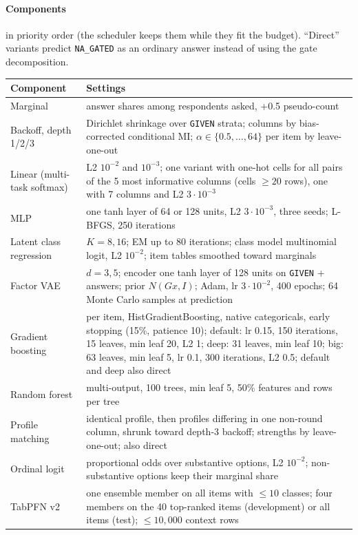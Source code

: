 \documentclass{article}
\begin{document}
\paragraph{Components} in priority order (the scheduler keeps them while they fit the budget).
``Direct'' variants predict \texttt{NA\_GATED} as an ordinary answer instead of using the gate
decomposition.

\begin{table}[h]
  \centering
  \small
  \begin{tabular}{p{3.6cm}p{9.2cm}}
    \toprule
    Component & Settings \\
    \midrule
    Marginal & answer shares among respondents asked, +0.5 pseudo-count \\
    Backoff, depth 1/2/3 & Dirichlet shrinkage over \texttt{GIVEN} strata; columns by bias-corrected conditional MI; $\alpha \in \{0.5,\dots,64\}$ per item by leave-one-out \\
    Linear (multi-task softmax) & L2 $10^{-2}$ and $10^{-3}$; one variant with one-hot cells for all pairs of the 5 most informative columns (cells $\geq 20$ rows), one with 7 columns and L2 $3\cdot10^{-3}$ \\
    MLP & one tanh layer of 64 or 128 units, L2 $3\cdot10^{-3}$, three seeds; L-BFGS, 250 iterations \\
    Latent class regression & $K = 8, 16$; EM up to 80 iterations; class model multinomial logit, L2 $10^{-2}$; item tables smoothed toward marginals \\
    Factor VAE & $d = 3, 5$; encoder one tanh layer of 128 units on \texttt{GIVEN} + answers; prior $N(Gx, I)$; Adam, lr $3\cdot10^{-2}$, 400 epochs; 64 Monte Carlo samples at prediction \\
    Gradient boosting & per item, HistGradientBoosting, native categoricals, early stopping (15\%, patience 10); default: lr 0.15, 150 iterations, 15 leaves, min leaf 20, L2 1; deep: 31 leaves, min leaf 10; big: 63 leaves, min leaf 5, lr 0.1, 300 iterations, L2 0.5; default and deep also direct \\
    Random forest & multi-output, 100 trees, min leaf 5, 50\% features and rows per tree \\
    Profile matching & identical profile, then profiles differing in one non-round column, shrunk toward depth-3 backoff; strengths by leave-one-out; also direct \\
    Ordinal logit & proportional odds over substantive options, L2 $10^{-2}$; non-substantive options keep their marginal share \\
    TabPFN v2 & one ensemble member on all items with $\leq 10$ classes; four members on the 40 top-ranked items (development) or all items (test); $\leq 10{,}000$ context rows \\
    \bottomrule
  \end{tabular}
\end{table}
\end{document}

